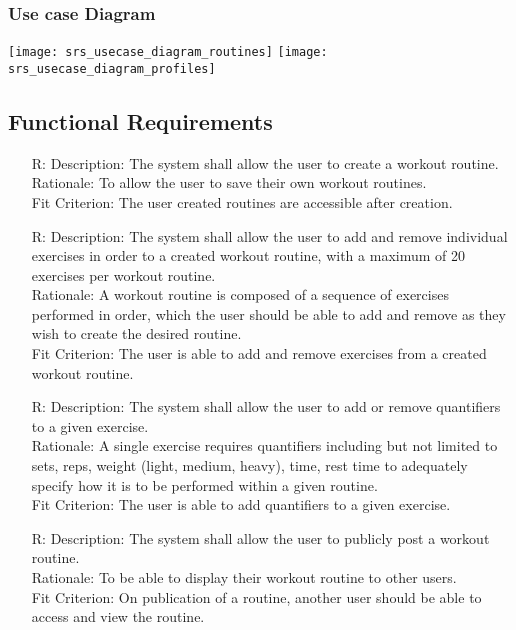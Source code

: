 \documentclass[12pt]{article}
\newcounter{reqnum} %
\begin{document}
\subsubsection{Use case Diagram}
\texttt{[image: srs\_usecase\_diagram\_routines]}
\newpage
\texttt{[image: srs\_usecase\_diagram\_profiles]}

\subsection{Functional Requirements}
\noindent \begin{itemize}

\item[R\refstepcounter{reqnum}\thereqnum \label{R_Inputs}:]
Description: The system shall allow the user to create a workout routine.
\\ Rationale: To allow the user to save their own workout routines.
\\ Fit Criterion: The user created routines are accessible after creation.

\item[R\refstepcounter{reqnum}\thereqnum \label{R_Inputs}:]
Description: The system shall allow the user to add and remove individual exercises in order to a created workout routine, with a maximum of 20 exercises per workout routine.
\\ Rationale: A workout routine is composed of a sequence of exercises performed in order, which the user should be able to add and remove as they wish to create the desired routine.
\\ Fit Criterion: The user is able to add and remove exercises from a created workout routine.

\item[R\refstepcounter{reqnum}\thereqnum \label{R_Inputs}:]
Description: The system shall allow the user to add or remove quantifiers to a given exercise.
\\ Rationale: A single exercise requires quantifiers including but not limited to sets, reps, weight (light, medium, heavy), time, rest time to adequately specify how it is to be performed within a given routine.
\\ Fit Criterion: The user is able to add quantifiers to a given exercise.

\item[R\refstepcounter{reqnum}\thereqnum \label{R_Inputs}:]
Description: The system shall allow the user to publicly post a workout routine.
\\ Rationale: To be able to display their workout routine to other users.
\\ Fit Criterion: On publication of a routine, another user should be able to access and view the routine.



\end{itemize}
\end{document}
